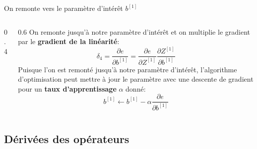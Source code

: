 \begin{frame}{On remonte vers le paramètre d'intérêt $b^{[1]}$}
\begin{columns}
\begin{column}{0.4\textwidth}
\begin{center}
{\begin{tikzpicture}
					\end{tikzpicture}
				}
			\end{center}
		\end{column}
		\begin{column}{0.6\textwidth}
			On remonte jusqu'à notre paramètre d'intérêt et on multiplie le gradient par le \textbf{\textcolor{lime!80!black}{gradient de la linéarité}}:
			\begin{equation*}
				\delta_4 = \frac{\partial{e}}{\partial{b^{[1]}}} = \frac{\partial{e}}{\partial{Z^{[1]}}} \frac{\partial{Z^{[1]}}}{\partial{b^{[1]}}}
			\end{equation*}
			Puisque l'on est remonté jusqu'à notre paramètre d'intérêt, l'algorithme d'optimisation peut mettre à jour le paramètre avec une descente de gradient pour un \textbf{taux d'apprentissage} $\alpha$ donné:
			\begin{equation*}
				b^{[1]} \leftarrow b^{[1]} - \alpha \frac{\partial{e}}{\partial{b^{[1]}}}
			\end{equation*}
		\end{column}
	\end{columns}
\end{frame}

\subsection[Dérivées des opérateurs]{Dérivées des opérateurs}

